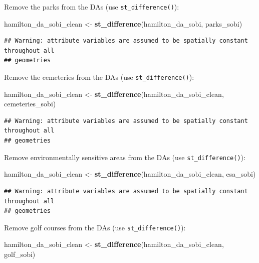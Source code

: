 \documentclass[
]{article}
\newenvironment{Shaded}{\begin{snugshade}}{\end{snugshade}}
\newcommand{\KeywordTok}[1]{\textcolor[rgb]{0.13,0.29,0.53}{\textbf{#1}}}
\newcommand{\NormalTok}[1]{#1}
\newcommand{\StringTok}[1]{\textcolor[rgb]{0.31,0.60,0.02}{#1}}
\begin{document}
Remove the parks from the DAs (use \texttt{st\_difference()}):

\begin{Shaded}
\begin{Highlighting}[]
\NormalTok{hamilton_da_sobi_clean <-}\StringTok{ }\KeywordTok{st_difference}\NormalTok{(hamilton_da_sobi, parks_sobi)}
\end{Highlighting}
\end{Shaded}

\begin{verbatim}
## Warning: attribute variables are assumed to be spatially constant throughout all
## geometries
\end{verbatim}

Remove the cemeteries from the DAs (use \texttt{st\_difference()}):

\begin{Shaded}
\begin{Highlighting}[]
\NormalTok{hamilton_da_sobi_clean <-}\StringTok{ }\KeywordTok{st_difference}\NormalTok{(hamilton_da_sobi_clean, cemeteries_sobi)}
\end{Highlighting}
\end{Shaded}

\begin{verbatim}
## Warning: attribute variables are assumed to be spatially constant throughout all
## geometries
\end{verbatim}

Remove environmentally sensitive areas from the DAs (use
\texttt{st\_difference()}):

\begin{Shaded}
\begin{Highlighting}[]
\NormalTok{hamilton_da_sobi_clean <-}\StringTok{ }\KeywordTok{st_difference}\NormalTok{(hamilton_da_sobi_clean, esa_sobi)}
\end{Highlighting}
\end{Shaded}

\begin{verbatim}
## Warning: attribute variables are assumed to be spatially constant throughout all
## geometries
\end{verbatim}

Remove golf courses from the DAs (use \texttt{st\_difference()}):

\begin{Shaded}
\begin{Highlighting}[]
\NormalTok{hamilton_da_sobi_clean <-}\StringTok{ }\KeywordTok{st_difference}\NormalTok{(hamilton_da_sobi_clean, golf_sobi)}
\end{Highlighting}
\end{Shaded}
\end{document}
